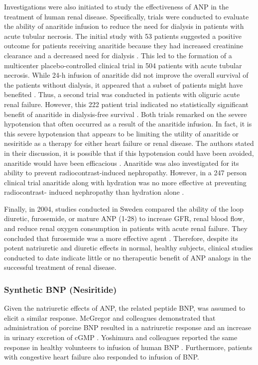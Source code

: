 \documentclass[14pt,a4paper,onecolumn]{extarticle}
\begin{document}
Investigations were also initiated to study the effectiveness of ANP in the treatment of human renal disease. Specifically, trials were conducted to evaluate the ability of anaritide infusion to reduce the need for dialysis in patients with acute tubular necrosis. The initial study with 53 patients suggested a positive outcome for patients receiving anaritide because they had increased creatinine clearance and a decreased need for dialysis \citep{Rahman1994}. This led to the formation of a multicenter placebo-controlled clinical trial in 504 patients with acute tubular necrosis. While 24-h infusion of anaritide did not improve the overall survival of the patients without dialysis, it appeared that a subset of patients might have benefited \citep{Allgren1997}.
Thus, a second trial was conducted in patients with oliguric acute renal failure. However, this 222 patient trial indicated no statistically significant benefit of anaritide in dialysis-free survival \citep{Lewis2000}. Both trials remarked on the severe hypotension that often occurred as a result of the anaritide infusion. In fact, it is this severe hypotension that appears to be limiting the utility of anaritide or nesiritide as a therapy for either heart failure or renal disease. The authors stated in their discussion, it is possible that if this hypotension could have been avoided, anaritide would have been efficacious \citep{Lewis2000}.  Anaritide was also investigated for its ability to prevent radiocontrast-induced nephropathy. However, in a 247 person clinical trial anaritide along with hydration was no more effective at preventing radiocontrast- induced nephropathy than hydration alone \citep{Kurnik1998}.

Finally, in 2004, studies conducted in Sweden compared the ability of the loop diuretic, furosemide, or mature ANP (1-28) to increase GFR, renal blood flow, and reduce renal oxygen consumption in patients with acute renal failure. They concluded that furosemide was a more effective agent \citep{Sward2005}. Therefore, despite its potent natriuretic and diuretic effects in normal, healthy subjects, clinical studies conducted to date indicate little or no therapeutic benefit of ANP analogs in the successful treatment of renal disease.

\subsubsection{Synthetic BNP (Nesiritide)}
Given the natriuretic effects of ANP, the related peptide BNP, was assumed to elicit a similar response. McGregor and colleagues demonstrated that administration of porcine BNP resulted in a natriuretic response and an increase in urinary excretion of cGMP \citep{McGregor1990}. Yoshimura and colleagues reported the same response in healthy volunteers to infusion of human BNP \citep{Yoshimura1991}. Furthermore, patients with congestive heart failure also responded to infusion of BNP.
\end{document}
